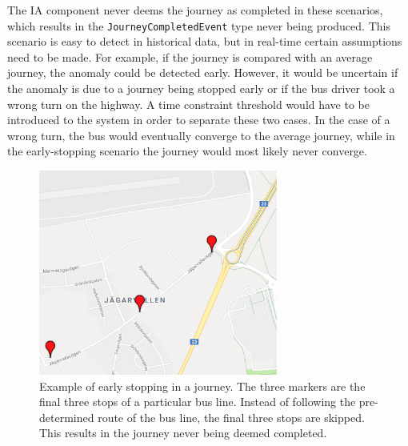 The IA component never deems the journey as completed in these scenarios, which results in the \texttt{JourneyCompletedEvent} type never being produced.
This scenario is easy to detect in historical data, but in real-time certain assumptions need to be made.
For example, if the journey is compared with an average journey, the anomaly could be detected early.
However, it would be uncertain if the anomaly is due to a journey being stopped early or if the bus driver took a wrong turn on the highway.
A time constraint threshold would have to be introduced to the system in order to separate these two cases.
In the case of a wrong turn, the bus would eventually converge to the average journey, while in the early-stopping scenario the journey would most likely never converge.

\begin{figure}[!ht]
    \centering
    \includegraphics[width=0.7\textwidth]{figures/edge_case_early_quit}
    \caption[Example of early stopping in a journey]
    {\small Example of early stopping in a journey.
    The three markers are the final three stops of a particular bus line.
    Instead of following the pre-determined route of the bus line, the final three stops are skipped.
    This results in the journey never being deemed completed.}
    \label{fig:human-error-early-stopping-1}
\end{figure}

